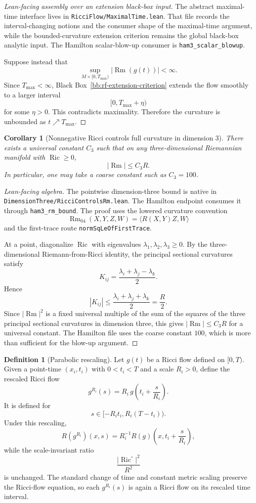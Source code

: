 \documentclass[11pt]{article}
\theoremstyle{plain}
\newtheorem{corollary}[theorem]{Corollary}
\theoremstyle{definition}
\newtheorem{definition}[theorem]{Definition}
\theoremstyle{remark}
\newcommand{\Ric}{\operatorname{Ric}}
\newcommand{\Rm}{\operatorname{Rm}}
\newcommand{\abs}[1]{\left|#1\right|}
\newcommand{\norm}[1]{\left|#1\right|}
\newcommand{\leanref}[1]{\nolinkurl{#1}}
\newcommand{\leanfile}[1]{\nolinkurl{#1}}
\newcommand{\rffile}[1]{\leanfile{#1}}
\begin{document}
\begin{proof}[Lean-facing assembly over an extension black-box input]
The abstract maximal-time interface lives in
\rffile{RicciFlow/MaximalTime.lean}.  That file records the interval-changing
notions and the consumer shape of the maximal-time argument, while the
bounded-curvature extension criterion remains the global black-box analytic
input.  The Hamilton scalar-blow-up consumer is \leanref{ham3_scalar_blowup}.

Suppose instead that
\[
\sup_{M\times[0,T_{\max})}\norm{\Rm(g(t))}<\infty.
\]
Since $T_{\max}<\infty$, Black Box~\ref{bb:rf-extension-criterion} extends the
flow smoothly to a larger interval
\[
[0,T_{\max}+\eta)
\]
for some $\eta>0$.  This contradicts maximality.  Therefore the curvature is
unbounded as \(t\nearrow T_{\max}\).
\end{proof}

\begin{corollary}[Nonnegative Ricci controls full curvature in dimension $3$]
\label{cor:ricci-controls-rm}
There exists a universal constant $C_3$ such that on any three-dimensional
Riemannian manifold with $\Ric\ge0$,
\[
\norm{\Rm}\le C_3R.
\]
In particular, one may take a coarse constant such as $C_3=100$.
\end{corollary}

\begin{proof}[Lean-facing algebra]
The pointwise dimension-three bound is native in
\rffile{DimensionThree/RicciControlsRm.lean}.  The Hamilton endpoint consumes
it through \leanref{ham3_rm_bound}.  The proof uses the lowered curvature
convention
\[
  \Rm_{04}(X,Y,Z,W)=\langle R(X,Y)Z,W\rangle
\]
and the first-trace route \leanref{normSqLeOfFirstTrace}.

At a point, diagonalize \(\Ric\) with eigenvalues
\(\lambda_1,\lambda_2,\lambda_3\ge0\).  By the three-dimensional
Riemann-from-Ricci identity, the principal sectional curvatures satisfy
\[
K_{ij}=\frac{\lambda_i+\lambda_j-\lambda_k}{2}.
\]
Hence
\[
\abs{K_{ij}}\le\frac{\lambda_i+\lambda_j+\lambda_k}{2}=\frac R2.
\]
Since \(\norm{\Rm}^2\) is a fixed universal multiple of the sum of the squares
of the three principal sectional curvatures in dimension three, this gives
\(\norm{\Rm}\le C_3R\) for a universal constant.  The Hamilton file uses the
coarse constant \(100\), which is more than sufficient for the blow-up
argument.
\end{proof}

\begin{definition}[Parabolic rescaling]
\label{def:parabolic-rescaling}
Let $g(t)$ be a Ricci flow defined on $[0,T)$. Given a point-time
$(x_i,t_i)$ with $0<t_i<T$ and a scale $R_i>0$, define the rescaled Ricci
flow
\[
g^{R_i}(s)=R_i\,g\left(t_i+\frac{s}{R_i}\right).
\]
It is defined for
\[
s\in[-R_it_i,R_i(T-t_i)).
\]
Under this rescaling,
\[
R(g^{R_i})(x,s)=R_i^{-1}R(g)\left(x,t_i+\frac{s}{R_i}\right),
\]
while the scale-invariant ratio
\[
\frac{\norm{\Ric^\circ}^2}{R^2}
\]
is unchanged.  The standard change of time and constant metric scaling preserve
the Ricci-flow equation, so each \(g^{R_i}(s)\) is again a Ricci flow on its
rescaled time interval.
\end{definition}
\end{document}

